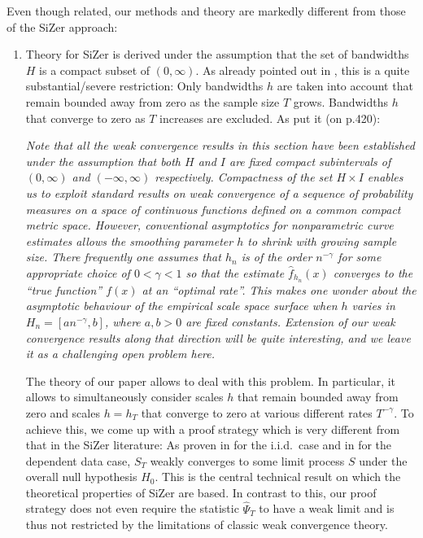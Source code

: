 \documentclass[a4paper,12pt]{article}
\begin{document}
Even though related, our methods and theory are markedly different from those of the SiZer approach:
\begin{enumerate}[label=(\roman*), leftmargin=0.8cm]

\item Theory for SiZer is derived under the assumption that the set of bandwidths $H$ is a compact subset of $(0,\infty)$. As already pointed out in \cite{ChaudhuriMarron2000}, this is a quite substantial/severe restriction: Only bandwidths $h$ are taken into account that remain bounded away from zero as the sample size $T$ grows. Bandwidths $h$ that converge to zero as $T$ increases are excluded.  As \cite{ChaudhuriMarron2000} put it (on p.420):
\vspace{0.15cm}

\begin{spacing}{1.0}
{\small \textit{Note that all the weak convergence results in this section have been established under the assumption that both $H$ and $I$ are fixed compact subintervals of $(0,\infty)$ and $(-\infty,\infty)$ respectively. Compactness of the set $H \times I$ enables us to exploit standard results on weak convergence of a sequence of probability measures on a space of continuous functions defined on a common compact metric space. However, conventional asymptotics for nonparametric curve estimates allows the smoothing parameter $h$ to shrink with growing sample size. There frequently one assumes that $h_n$ is of the order $n^{-\gamma}$ for some appropriate choice of $0 < \gamma < 1$ so that the estimate $\hat{f}_{h_n}(x)$ converges to the ``true function'' $f(x)$ at an ``optimal rate''. This makes one wonder about the asymptotic behaviour of the empirical scale space surface when $h$ varies in $H_n = [a n^{-\gamma},b]$, where $a,b > 0$ are fixed constants. Extension of our weak convergence results along that direction will be quite interesting, and we leave it as a challenging open problem here.} }
\end{spacing} 
\vspace{0.2cm}

The theory of our paper allows to deal with this problem. In particular, it allows to simultaneously consider scales $h$ that remain bounded away from zero and scales $h = h_T$ that converge to zero at various different rates $T^{-\gamma}$. To achieve this, we come up with a proof strategy which is very different from that in the SiZer literature:  As proven in \cite{ChaudhuriMarron2000} for the i.i.d.\ case and in \cite{ParkHannigKang2009} for the dependent data case, $S_T$ weakly converges to some limit process $S$ under the overall null hypothesis $H_0$. This is the central technical result on which the theoretical properties of SiZer are based. In contrast to this, our proof strategy does not even require the statistic $\widehat{\Psi}_T$ to have a weak limit and is thus not restricted by the limitations of classic weak convergence theory. 


\end{enumerate}
\end{document}
